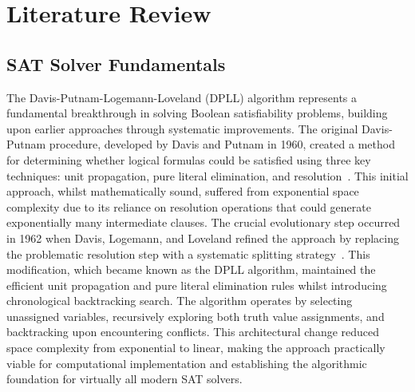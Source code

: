 \section{Literature Review} 

\subsection{SAT Solver Fundamentals}
The Davis-Putnam-Logemann-Loveland (DPLL) algorithm represents a fundamental breakthrough in solving Boolean satisfiability problems, building upon earlier approaches through systematic improvements. The original Davis-Putnam procedure, developed by Davis and Putnam in 1960, created a method for determining whether logical formulas could be satisfied using three key techniques: unit propagation, pure literal elimination, and resolution~\cite{davis1960computing}. This initial approach, whilst mathematically sound, suffered from exponential space complexity due to its reliance on resolution operations that could generate exponentially many intermediate clauses. The crucial evolutionary step occurred in 1962 when Davis, Logemann, and Loveland refined the approach by replacing the problematic resolution step with a systematic splitting strategy~\cite{davis1962machine}. This modification, which became known as the DPLL algorithm, maintained the efficient unit propagation and pure literal elimination rules whilst introducing chronological backtracking search. The algorithm operates by selecting unassigned variables, recursively exploring both truth value assignments, and backtracking upon encountering conflicts. This architectural change reduced space complexity from exponential to linear, making the approach practically viable for computational implementation and establishing the algorithmic foundation for virtually all modern SAT solvers.

